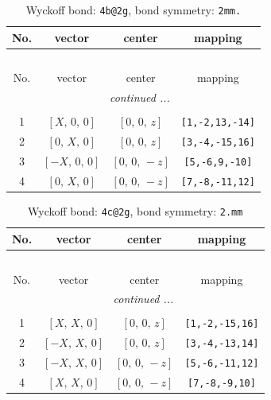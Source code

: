 \documentclass[fleqn,8pt]{jsarticle}
\begin{document}
\renewcommand{\arraystretch}{1.2}
\begin{longtable}{cccc}
\caption{Wyckoff bond: {\tt 4b@2g}, bond symmetry: {\tt 2mm.}}
 \\
 \hline \hline
No. & vector & center & mapping \\ \hline \endfirsthead

\multicolumn{3}{l}{\tablename\ \thetable{}} \\
 \hline \hline
No. & vector & center & mapping \\ \hline \endhead

 \hline \hline
\multicolumn{3}{r}{\footnotesize\it continued ...} \\ \endfoot

 \hline \hline
\multicolumn{3}{r}{} \\ \endlastfoot

1 & $\left[ X,\, 0,\, 0 \right]$ & $\left[ 0,\, 0,\, z \right]$ & {\tt [1,-2,13,-14]} \\ \hline
2 & $\left[ 0,\, X,\, 0 \right]$ & $\left[ 0,\, 0,\, z \right]$ & {\tt [3,-4,-15,16]} \\ \hline
3 & $\left[ - X,\, 0,\, 0 \right]$ & $\left[ 0,\, 0,\, - z \right]$ & {\tt [5,-6,9,-10]} \\ \hline
4 & $\left[ 0,\, X,\, 0 \right]$ & $\left[ 0,\, 0,\, - z \right]$ & {\tt [7,-8,-11,12]} \\
\end{longtable}
\renewcommand{\arraystretch}{1.2}
\begin{longtable}{cccc}
\caption{Wyckoff bond: {\tt 4c@2g}, bond symmetry: {\tt 2.mm}}
 \\
 \hline \hline
No. & vector & center & mapping \\ \hline \endfirsthead

\multicolumn{3}{l}{\tablename\ \thetable{}} \\
 \hline \hline
No. & vector & center & mapping \\ \hline \endhead

 \hline \hline
\multicolumn{3}{r}{\footnotesize\it continued ...} \\ \endfoot

 \hline \hline
\multicolumn{3}{r}{} \\ \endlastfoot

1 & $\left[ X,\, X,\, 0 \right]$ & $\left[ 0,\, 0,\, z \right]$ & {\tt [1,-2,-15,16]} \\ \hline
2 & $\left[ - X,\, X,\, 0 \right]$ & $\left[ 0,\, 0,\, z \right]$ & {\tt [3,-4,-13,14]} \\ \hline
3 & $\left[ - X,\, X,\, 0 \right]$ & $\left[ 0,\, 0,\, - z \right]$ & {\tt [5,-6,-11,12]} \\ \hline
4 & $\left[ X,\, X,\, 0 \right]$ & $\left[ 0,\, 0,\, - z \right]$ & {\tt [7,-8,-9,10]} \\
\end{longtable}
\end{document}
